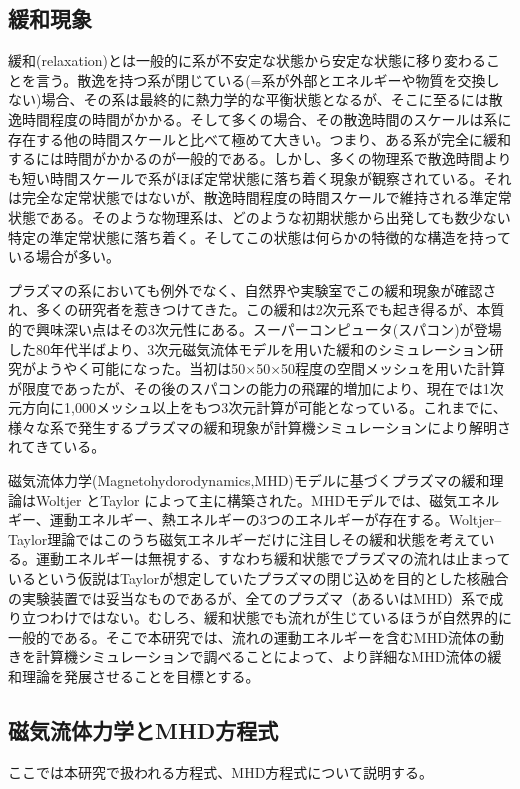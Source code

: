 \documentclass[12pt]{jsarticle}
\begin{document}
\subsection{緩和現象}
緩和(relaxation)とは一般的に系が不安定な状態から安定な状態に移り変わることを言う。散逸を持つ系が閉じている(=系が外部とエネルギーや物質を交換しない)場合、その系は最終的に熱力学的な平衡状態となるが、そこに至るには散逸時間程度の時間がかかる。そして多くの場合、その散逸時間のスケールは系に存在する他の時間スケールと比べて極めて大きい。つまり、ある系が完全に緩和するには時間がかかるのが一般的である。しかし、多くの物理系で散逸時間よりも短い時間スケールで系がほぼ定常状態に落ち着く現象が観察されている。それは完全な定常状態ではないが、散逸時間程度の時間スケールで維持される準定常状態である。そのような物理系は、どのような初期状態から出発しても数少ない特定の準定常状態に落ち着く。そしてこの状態は何らかの特徴的な構造を持っている場合が多い。

プラズマの系においても例外でなく、自然界や実験室でこの緩和現象が確認され、多くの研究者を惹きつけてきた。この緩和は2次元系でも起き得るが、本質的で興味深い点はその3次元性にある。スーパーコンピュータ(スパコン)が登場した80年代半ばより、3次元磁気流体モデルを用いた緩和のシミュレーション研究がようやく可能になった。当初は50×50×50程度の空間メッシュを用いた計算が限度であったが、その後のスパコンの能力の飛躍的増加により、現在では1次元方向に1,000メッシュ以上をもつ3次元計算が可能となっている。これまでに、様々な系で発生するプラズマの緩和現象が計算機シミュレーションにより解明されてきている\cite{プラズマ核融合シミュレーションの発展と将来への期待}。

磁気流体力学(Magnetohydorodynamics,MHD)モデルに基づくプラズマの緩和理論はWoltjer \cite{woltjer1958theorem}とTaylor \cite{taylor1974relaxation}によって主に構築された。MHDモデルでは、磁気エネルギー、運動エネルギー、熱エネルギーの3つのエネルギーが存在する。Woltjer--Taylor理論ではこのうち磁気エネルギーだけに注目しその緩和状態を考えている。運動エネルギーは無視する、すなわち緩和状態でプラズマの流れは止まっているという仮説はTaylorが想定していたプラズマの閉じ込めを目的とした核融合の実験装置では妥当なものであるが、全てのプラズマ（あるいはMHD）系で成り立つわけではない。むしろ、緩和状態でも流れが生じているほうが自然界的に一般的である。そこで本研究では、流れの運動エネルギーを含むMHD流体の動きを計算機シミュレーション\cite{コンピュータによる熱移動と流れの数値解析}で調べることによって、より詳細なMHD流体の緩和理論を発展させることを目標とする。


\subsection{磁気流体力学とMHD方程式}
ここでは本研究で扱われる方程式、MHD方程式について説明する。
\end{document}
